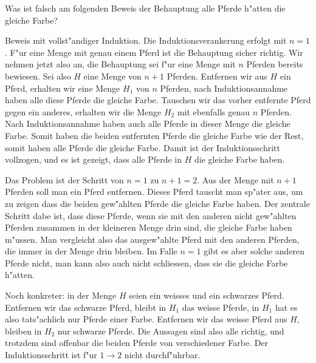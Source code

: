 Was ist falsch am folgenden Beweis der Behauptung alle Pferde h"atten die
gleiche Farbe?

Beweis mit vollst"andiger Induktion. Die Induktionsverankerung
erfolgt mit $n=1$. F"ur eine Menge mit genau einem Pferd ist
die Behauptung sicher richtig. Wir nehmen jetzt also an, die
Behauptung sei f"ur eine Menge mit $n$ Pferden bereits bewiesen.
Sei also $H$ eine Menge von $n+1$ Pferden. Entfernen wir aus $H$
ein Pferd, erhalten wir eine Menge $H_1$ von $n$ Pferden, nach
Induktionsannahme haben alle diese Pferde die gleiche Farbe.
Tauschen wir das vorher entfernte Pferd gegen ein anderes, erhalten
wir die Menge $H_2$ mit ebenfalls genau $n$ Pferden. Nach Induktionsannahme
haben auch alle Pferde in dieser Menge die gleiche Farbe. Somit
haben die beiden entfernten Pferde die gleiche Farbe wie der Rest,
somit haben alle Pferde die gleiche Farbe. Damit ist der Induktionsschritt
vollzogen, und es ist gezeigt, dass alle Pferde in $H$ die gleiche Farbe
haben.

\begin{loesung}
Das Problem ist der Schritt von $n=1$ zu $n+1=2$.
Aus der Menge mit $n+1$ Pferden soll man ein Pferd entfernen.
Dieses Pferd tauscht man sp"ater aus, um zu zeigen dass die
beiden gew"ahlten Pferde die gleiche Farbe haben. Der zentrale
Schritt dabe ist, dass diese Pferde, wenn sie mit den anderen nicht
gew"ahlten Pferden zusammen in der kleineren Menge drin sind,
die gleiche Farbe haben m"ussen. Man vergleicht also das ausgew"ahlte
Pferd mit den anderen Pferden, die immer in der Menge drin bleiben.
Im Falle $n=1$ gibt es aber solche
anderen Pferde nicht, man kann also auch nicht schliessen, dass
sie die gleiche Farbe h"atten.

Noch konkreter: in der Menge $H$ seien ein weisses und ein schwarzes Pferd.
Entfernen wir das schwarze Pferd, bleibt in $H_1$ das weisse Pferde,
in $H_1$ hat es also tats"achlich nur Pferde einer Farbe. Entfernen
wir das weisse Pferd aus $H$, bleiben in $H_2$ nur schwarze
Pferde. Die Aussagen sind also alle richtig, und trotzdem sind
offenbar die beiden Pferde von verschiedener Farbe. Der Induktionsschritt
ist f"ur $1\to 2$ nicht durchf"uhrbar.
\end{loesung}
